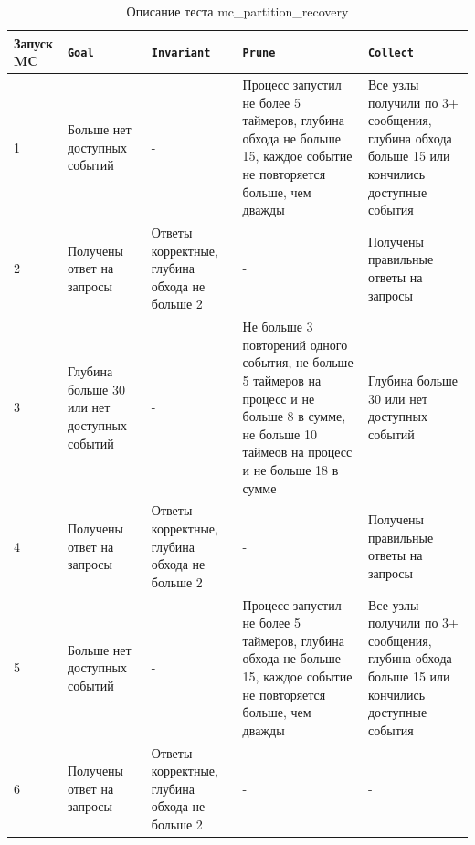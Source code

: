 \documentclass[a4paper,12pt]{extarticle}
\newcommand{\goal}[0]{\texttt{Goal}}
\newcommand{\prune}[0]{\texttt{Prune}}
\newcommand{\invariant}[0]{\texttt{Invariant}}
\newcommand{\collect}[0]{\texttt{Collect}}
\newcommand{\mc}[0]{MC}
\begin{document}
\begin{table}[htbp]
    \caption{Описание теста mc\_partition\_recovery}
    \begin{center}
    \begin{tabular}{|p{}|p{}|p{}|p{}|p{} |}
    \hline
    Запуск \mc & \goal & \invariant & \prune & \collect \\
    \hline
    1  & Больше нет доступных событий & - & Процесс запустил не более 5 таймеров, глубина обхода не больше 15, каждое событие не повторяется больше, чем дважды & Все узлы получили по 3+ сообщения, глубина обхода больше 15 или кончились доступные события \\
    \hline
    2 & Получены ответ на запросы & Ответы корректные, глубина обхода не больше 2 & - & Получены правильные ответы на запросы \\
    \hline
    3 & Глубина больше 30 или нет доступных событий & - & Не больше 3 повторений одного события, не больше 5 таймеров на процесс и не больше 8 в сумме, не больше 10 таймеов на процесс и не больше 18 в сумме  & Глубина больше 30 или нет доступных событий \\
    \hline
    4 & Получены ответ на запросы & Ответы корректные, глубина обхода не больше 2 & - & Получены правильные ответы на запросы \\
    \hline
    5  & Больше нет доступных событий & - & Процесс запустил не более 5 таймеров, глубина обхода не больше 15, каждое событие не повторяется больше, чем дважды & Все узлы получили по 3+ сообщения, глубина обхода больше 15 или кончились доступные события \\
    \hline
    6 & Получены ответ на запросы & Ответы корректные, глубина обхода не больше 2 & - & - \\
    \hline

    \end{tabular}
    \label{testmembershiprecovery}
    \end{center}
\end{table}





\end{document}
